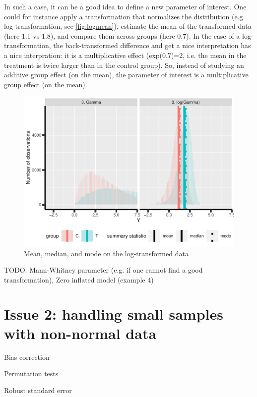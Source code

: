 \documentclass[12pt]{article}
\begin{document}
 In such a case, it can be a good idea to define a new parameter of
interest. One could for instance apply a transformation that
normalizes the distribution (e.g. log-transformation, see \autoref{fig:logmean}), estimate the
mean of the transformed data (here 1.1 vs 1.8), and compare them
across groups (here 0.7). In the case of a log-transformation, the
back-transformed difference and get a nice interpretation has a nice
interpration: it is a multiplicative effect (exp(0.7)=2, i.e. the mean
in the treatment is twice larger than in the control group). So,
instead of studying an additive group effect (on the mean), the parameter of
interest is a multiplicative group effect (on the mean).


\clearpage

\begin{figure}[!h]
\centering
\includegraphics[width=\textwidth]{./figures/logmean.pdf}
\caption{\label{fig:logmean}Mean, median, and mode on the log-transformed data}
\end{figure}


TODO: Mann-Whitney parameter (e.g. if one cannot find a good transformation), Zero inflated model (example 4)

\clearpage

\section{Issue 2: handling small samples with non-normal data}
\label{sec:orgb081a90}

Bias correction

Permutation tests

Robust standard error
\end{document}
